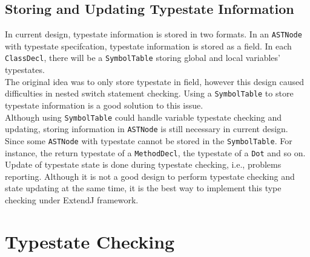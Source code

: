 \documentclass[]{article}
\begin{document}
\subsection{Storing and Updating Typestate Information}
In current design, typestate information is stored in two formats. In an \texttt{ASTNode} with typestate specifcation, typestate information is stored as a field. In each \texttt{ClassDecl}, there will be a \texttt{SymbolTable} storing global and local variables' typestates.\\[0.2cm]
The original idea was to only store typestate in field, however this design caused difficulties in nested switch statement checking. Using a \texttt{SymbolTable} to store typestate information is a good solution to this issue.\\[0.2cm]
Although using \texttt{SymbolTable} could handle variable typestate checking and updating, storing information in \texttt{ASTNode} is still necessary in current design. Since some \texttt{ASTNode} with typestate cannot be stored in the \texttt{SymbolTable}. For instance, the return typestate of a \texttt{MethodDecl}, the typestate of a \texttt{Dot} and so on. \\[0.2cm]
Update of typestate state is done during typestate checking, i.e., problems reporting. Although it is not a good design to perform typestate checking and state updating at the same time, it is the best way to implement this type checking under ExtendJ framework.

\section{Typestate Checking}
\end{document}
